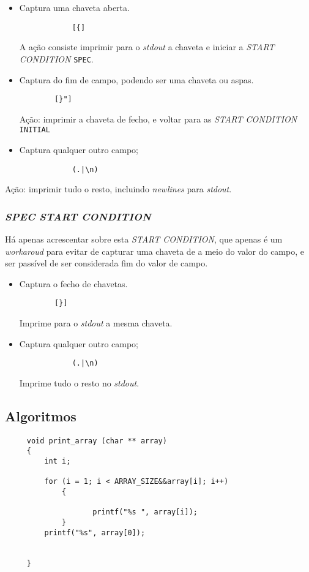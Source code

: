 \begin{itemize}
  \item Captura uma chaveta aberta.
    \begin{verbatim}
			[{]
    \end{verbatim}
		A ação consiste imprimir para o \emph{stdout} a chaveta e iniciar
		a \emph{START CONDITION} \texttt{SPEC}.

  \item Captura do fim de campo, podendo ser uma chaveta ou aspas.
    \begin{verbatim}
		[}"]
    \end{verbatim}
		Ação: imprimir a chaveta de fecho, e voltar para as \emph{START CONDITION}
		\texttt{INITIAL}

  \item Captura qualquer outro campo;
    \begin{verbatim}
			(.|\n)
    \end{verbatim}
\end{itemize}
Ação: imprimir tudo o resto, incluindo \emph{newlines} para \emph{stdout}.



\subsubsection{\emph{SPEC \emph{START CONDITION}}}

Há apenas acrescentar sobre esta \emph{START CONDITION}, que apenas é um
\emph{workaroud} para evitar de capturar uma chaveta de a meio do valor do
campo, e ser passível de ser considerada fim do valor de campo. 


\begin{itemize}
  \item Captura o fecho de chavetas.
    \begin{verbatim}
		[}]
    \end{verbatim}
		Imprime para o \emph{stdout} a mesma chaveta.


  \item Captura qualquer outro campo;
    \begin{verbatim}
			(.|\n)
    \end{verbatim}
		Imprime tudo o resto no \emph{stdout}.
	
\end{itemize}
\subsection{Algoritmos}
\begin{Verbatim}
     void print_array (char ** array)
     {
         int i;
     	
         for (i = 1; i < ARRAY_SIZE&&array[i]; i++)
             {
     						
     	            printf("%s ", array[i]);
             }
         printf("%s", array[0]);
     										
     															
     }

\end{Verbatim}

